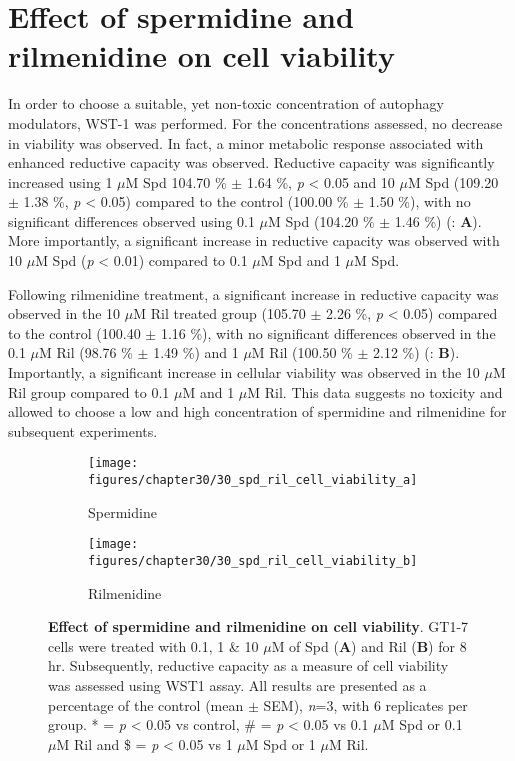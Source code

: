 {\section{Effect of spermidine and rilmenidine on cell viability}
In order to choose a suitable, yet non-toxic concentration of autophagy modulators, WST-1 was performed. For the concentrations assessed, no decrease in viability was observed. In fact, a minor metabolic response associated with enhanced reductive capacity was observed. Reductive capacity was significantly increased using 1 $\mu$M Spd 104.70 \% $\pm$ 1.64 \%, \textit{p} < 0.05 and 10 $\mu$M Spd (109.20 $\pm$ 1.38 \%, \textit{p} < 0.05) compared to the control (100.00 \% $\pm$ 1.50 \%), with no significant differences observed using 0.1 $\mu$M Spd (104.20 \% $\pm$ 1.46 \%) (: \textbf{A}). More importantly, a significant increase in reductive capacity was observed with 10 $\mu$M Spd (\textit{p} < 0.01) compared to 0.1 $\mu$M Spd and 1 $\mu$M Spd.

Following rilmenidine treatment, a significant increase in reductive capacity was observed in the 10 $\mu$M Ril treated group (105.70 $\pm$ 2.26 \%, \textit{p} < 0.05) compared to the control (100.40 $\pm$ 1.16 \%), with no significant differences observed in the 0.1 $\mu$M Ril (98.76 \% $\pm$ 1.49 \%) and 1 $\mu$M Ril (100.50 \% $\pm$ 2.12 \%) (: \textbf{B}). Importantly, a significant increase in cellular viability was observed in the 10 $\mu$M Ril group compared to 0.1 $\mu$M and 1 $\mu$M Ril. This data suggests no toxicity and allowed to choose a low and high concentration of spermidine and rilmenidine for subsequent experiments.

\begin{figure}[!htbp]
  \centering
  \begin{subfigure}[b]{0.495\linewidth}
    \texttt{[image: figures/chapter30/30\_spd\_ril\_cell\_viability\_a]}
    \caption{Spermidine}
  \end{subfigure}
  \begin{subfigure}[b]{0.495\linewidth}
    \texttt{[image: figures/chapter30/30\_spd\_ril\_cell\_viability\_b]}
    \caption{Rilmenidine}
  \end{subfigure}
  \caption[Effect of spermidine and rilmenidine on cell viability]{\textbf{Effect of spermidine and rilmenidine on cell viability}. GT1-7 cells were treated with 0.1, 1 \& 10 $\mu$M of Spd (\textbf{A}) and Ril (\textbf{B}) for 8 hr. Subsequently, reductive capacity as a measure of cell viability was assessed using WST1 assay. All results are presented as a percentage of the control (mean $\pm$ SEM), \textit{n}=3, with 6 replicates per group. * = \textit{p} < 0.05 vs control, \# = \textit{p} < 0.05 vs 0.1 $\mu$M Spd or 0.1 $\mu$M Ril and \$ = \textit{p} < 0.05 vs 1 $\mu$M Spd or 1 $\mu$M Ril.}
  \label{fig:30_spd_ril_cell_viability_a}
\end{figure}

}
